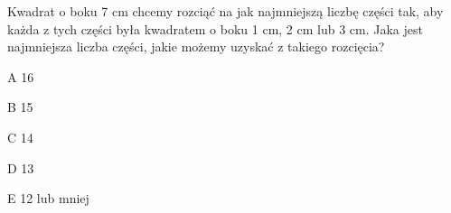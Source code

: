 \begin{tresc}
Kwadrat o boku 7 cm chcemy rozciąć na jak najmniejszą liczbę części tak, aby każda z tych części była kwadratem o boku 1 cm, 2 cm lub 3 cm. Jaka jest najmniejsza liczba części, jakie możemy uzyskać z takiego rozcięcia?
\end{tresc}
\begin{wariant}{A} 16 \end{wariant}
\begin{wariant}{B} 15 \end{wariant}
\begin{wariant}{C} 14 \end{wariant}
\begin{wariant}{D} 13 \end{wariant}
\begin{wariant}{E} 12 lub mniej \end{wariant}
